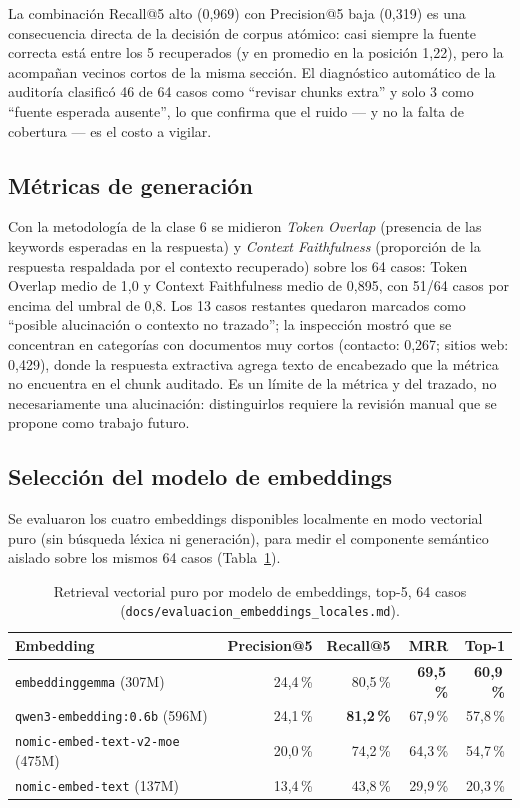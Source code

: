 \documentclass[11pt,a4paper]{article}
\newcommand{\code}[1]{\texttt{#1}}
\begin{document}
La combinación Recall@5 alto (0{,}969) con Precision@5 baja (0{,}319) es una
consecuencia directa de la decisión de corpus atómico: casi siempre la fuente
correcta está entre los 5 recuperados (y en promedio en la posición 1{,}22),
pero la acompañan vecinos cortos de la misma sección. El diagnóstico
automático de la auditoría clasificó 46 de 64 casos como ``revisar chunks
extra'' y solo 3 como ``fuente esperada ausente'', lo que confirma que el
ruido --- y no la falta de cobertura --- es el costo a vigilar.

\subsection{Métricas de generación}

Con la metodología de la clase 6 se midieron \emph{Token Overlap} (presencia
de las keywords esperadas en la respuesta) y \emph{Context Faithfulness}
(proporción de la respuesta respaldada por el contexto recuperado) sobre los
64 casos: Token Overlap medio de 1{,}0 y Context Faithfulness medio de
0{,}895, con 51/64 casos por encima del umbral de 0{,}8. Los 13 casos
restantes quedaron marcados como ``posible alucinación o contexto no
trazado''; la inspección mostró que se concentran en categorías con
documentos muy cortos (contacto: 0{,}267; sitios web: 0{,}429), donde la
respuesta extractiva agrega texto de encabezado que la métrica no encuentra
en el chunk auditado. Es un límite de la métrica y del trazado, no
necesariamente una alucinación: distinguirlos requiere la revisión manual
que se propone como trabajo futuro.

\subsection{Selección del modelo de embeddings}\label{sec:embeddings}

Se evaluaron los cuatro embeddings disponibles localmente en modo vectorial
puro (sin búsqueda léxica ni generación), para medir el componente semántico
aislado sobre los mismos 64 casos (Tabla~\ref{tab:embeddings}).

\begin{table}[H]
\centering
\begin{tabular}{lrrrr}
\toprule
\textbf{Embedding} & \textbf{Precision@5} & \textbf{Recall@5} & \textbf{MRR} & \textbf{Top-1} \\
\midrule
\code{embeddinggemma} (307M) & 24{,}4\,\% & 80{,}5\,\% & \textbf{69{,}5\,\%} & \textbf{60{,}9\,\%} \\
\code{qwen3-embedding:0.6b} (596M) & 24{,}1\,\% & \textbf{81{,}2\,\%} & 67{,}9\,\% & 57{,}8\,\% \\
\code{nomic-embed-text-v2-moe} (475M) & 20{,}0\,\% & 74{,}2\,\% & 64{,}3\,\% & 54{,}7\,\% \\
\code{nomic-embed-text} (137M) & 13{,}4\,\% & 43{,}8\,\% & 29{,}9\,\% & 20{,}3\,\% \\
\bottomrule
\end{tabular}
\caption{Retrieval vectorial puro por modelo de embeddings, top-5, 64 casos
(\code{docs/evaluacion\_embeddings\_locales.md}).}
\label{tab:embeddings}
\end{table}
\end{document}
